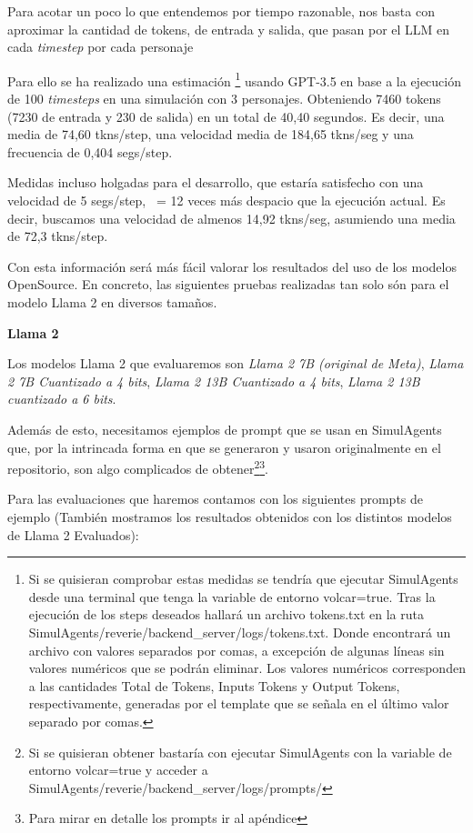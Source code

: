 Para acotar un poco lo que entendemos por tiempo razonable, nos basta con aproximar la cantidad de tokens, de entrada y salida, que pasan por el LLM en cada \textit{timestep} por cada personaje

Para ello se ha realizado una estimación \footnote{Si se quisieran comprobar estas medidas se tendría que ejecutar SimulAgents desde una terminal que tenga la variable de entorno volcar=true. Tras la ejecución de los steps deseados hallará un archivo tokens.txt en la ruta SimulAgents/reverie/backend\_server/logs/tokens.txt. Donde encontrará un archivo con valores separados por comas, a excepción de algunas líneas sin valores numéricos que se podrán eliminar. Los valores numéricos corresponden a las cantidades Total de Tokens, Inputs Tokens y Output Tokens, respectivamente, generadas por el template que se señala en el último valor separado por comas.} usando GPT-3.5 en base a la ejecución de 100 \textit{timesteps} en una simulación con 3 personajes. Obteniendo 7460 tokens (7230 de entrada y 230 de salida) en un total de 40,40 segundos. Es decir, una media de 74,60 tkns/step, una velocidad media de 184,65 tkns/seg y una frecuencia de 0,404 segs/step.

Medidas incluso holgadas para el desarrollo, que estaría satisfecho con una velocidad de 5 segs/step, ~= 12 veces más despacio que la ejecución actual. Es decir, buscamos una velocidad de almenos 14,92 tkns/seg, asumiendo una media de 72,3 tkns/step.

Con esta información será más fácil valorar los resultados del uso de los modelos OpenSource. En concreto, las siguientes pruebas realizadas tan solo són para el modelo Llama 2 en diversos tamaños.

\textbf{Llama 2}

Los modelos Llama 2 que evaluaremos son \textit{Llama 2 7B (original de Meta)}, \textit{Llama 2 7B Cuantizado a 4 bits}, \textit{Llama 2 13B Cuantizado a 4 bits}, \textit{Llama 2 13B cuantizado a 6 bits}.

Además de esto, necesitamos ejemplos de prompt que se usan en SimulAgents que, por la intrincada forma en que se generaron y usaron originalmente en el repositorio, son algo complicados de obtener\footnote{Si se quisieran obtener bastaría con ejecutar SimulAgents con la variable de entorno volcar=true y acceder a SimulAgents/reverie/backend\_server/logs/prompts/}\footnote{Para mirar en detalle los prompts ir al apéndice}.

Para las evaluaciones que haremos contamos con los siguientes prompts de ejemplo (También mostramos los resultados obtenidos con los distintos modelos de Llama 2 Evaluados):

